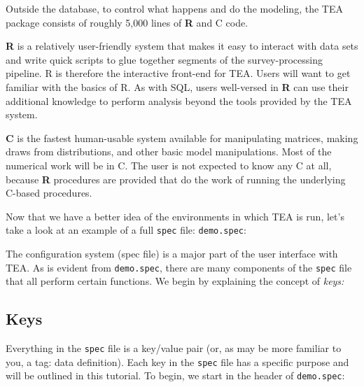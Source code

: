 \documentclass{article}
\begin{document}
Outside the database, to control what happens and
do the modeling, the TEA package consists of roughly 5,000 lines of \textbf{R} and C code.

{\bf R} is a relatively user-friendly system that makes it easy to interact with data
sets and write quick scripts to glue together segments of the survey-processing pipeline.
R is therefore the interactive front-end for TEA. Users will want to get familiar with the basics of
R.  As with SQL, users well-versed in \textbf{R} can use their additional knowledge to perform
analysis beyond the tools provided by the TEA system.

{\bf C} is the fastest human-usable system available for manipulating matrices, making
draws from distributions, and other basic model manipulations. Most of the numerical
work will be in C. The user is not expected to know any C at all, because \textbf{R} procedures
are provided that do the work of running the underlying C-based procedures.

Now that we have a better idea of the environments in which TEA is run, let's take a look  
at an example of a full {\tt spec} file: {\tt demo.spec}:

The configuration system (spec file) is a major part of the user interface with TEA. As is evident 
from {\tt demo.spec}, there are many components of the {\tt spec} file that all perform certain functions. 
We begin by explaining the concept of \textit{keys:}

\subsection{Keys}
Everything in the {\tt spec} file is a key/value pair (or, as may be more familiar to 
you, a tag: data definition). Each key in the {\tt spec} file has a specific purpose and 
will be outlined in this tutorial.
To begin, we start in the header of {\tt demo.spec}:
\end{document}
